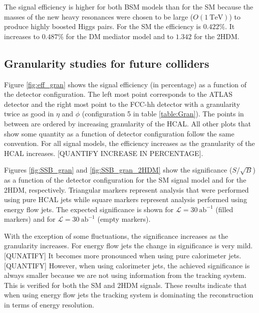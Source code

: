The signal efficiency is higher for both BSM models than for the SM because the masses of the new heavy resonances were chosen to be large ($O(1 ~\text{TeV})$) to produce highly boosted Higgs pairs. For the SM the efficiency is $0.422\%$. It increases to $0.487\%$ for the DM mediator model and to $1.342$ for the 2HDM. 

\subsection{Granularity studies for future colliders}
\label{sec:gran_studies}

Figure \ref{fig:eff_gran} shows the signal efficiency (in percentage) as a function of the detector configuration. The left most point corresponds to the ATLAS detector and the right most point to the FCC-hh detector with a granularity twice as good in $\eta$ and $\phi$ (configuration 5 in table \ref{table:Gran}). The points in between are ordered by increasing granularity of the HCAL. All other plots that show some quantity as a function of detector configuration follow the same convention. For all signal models, the efficiency increases as the granularity of the HCAL increases. [QUANTIFY INCREASE IN PERCENTAGE].

Figures \ref{fig:SSB_gran} and \ref{fig:SSB_gran_2HDM} show the significance ($S/\sqrt{B}$) as a function of the detector configuration for the SM signal model and for the 2HDM, respectively. Triangular markers represent analysis that were performed using pure HCAL jets while square markers represent analysis performed using energy flow jets. The expected significance is shown for $\mathcal{L}=30~\text{ab}^{-1}$ (filled markers)
and for $\mathcal{L}=30~\text{ab}^{-1}$ (empty markers). 

With the exception of some fluctuations, the significance increases as the granularity increases. For energy flow jets the change in significance is very mild. [QUNATIFY] It becomes more pronounced when using pure calorimeter jets. [QUANTIFY] However, when using calorimeter jets, the achieved significance is always smaller because we are not using information from the tracking system. This is verified for both the SM and 2HDM signals. These results indicate that when using energy flow jets the tracking system is dominating the reconstruction in terms of energy resolution.

